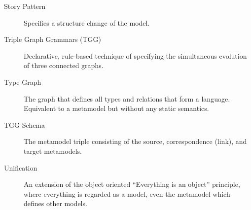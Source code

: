 \begin{description}
\item[Story Pattern]
Specifies a structure change of the model.

\item[Triple Graph Grammars (TGG)] 
Declarative, rule-based technique of specifying the simultaneous evolution of three connected graphs.

\item[Type Graph] 
The graph that defines all types and relations that form a language. Equivalent to a metamodel but without any static semantics.

\item[TGG Schema] 
The metamodel triple consisting of the source, correspondence (link), and target metamodels.

\item[Unification]  
An extension of the object oriented ``Everything is an object'' principle, where everything is regarded as a model, even the metamodel which defines other
models.

\end{description}
